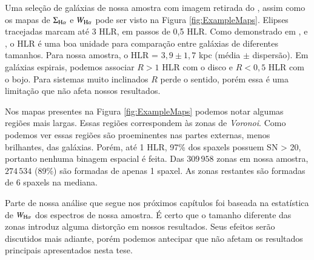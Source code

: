 Uma seleção de galáxias de nossa amostra com imagem retirada do \SDSS, assim como os mapas de $\Sigma_{\Ha}$ e $W_{\Ha}$ pode ser visto na Figura \ref{fig:ExampleMaps}. Elipses tracejadas marcam até 3 HLR, em passos de 0,5 HLR. Como demonstrado em \citet{Perez.etal.2013}, \citet{Sanchez.etal.2014} e \citet{GonzalezDelgado.etal.2016a}, o HLR é uma boa unidade para comparação entre galáxias de diferentes tamanhos. Para nossa amostra, o HLR = $3,9 \pm 1,7$ kpc (média $\pm$ dispersão). Em galáxias espirais, podemos associar $R > 1$ HLR com o disco e $R < 0,5$ HLR com o bojo. Para sistemas muito inclinados $R$ perde o sentido, porém essa é uma limitação que não afeta nossos resultados.

Nos mapas presentes na Figura \ref{fig:ExampleMaps} podemos notar algumas regiões mais largas. Essas regiões correspondem às zonas de {\em Voronoi}. Como podemos ver essas regiões são proeminentes nas partes externas, menos brilhantes, das galáxias. Porém, até 1 HLR, 97\% dos spaxels possuem SN > 20, portanto nenhuma binagem espacial é feita. Das $309\,958$ zonas em nossa amostra, $274\,534$ (89\%) são formadas de apenas 1 spaxel. As zonas restantes são formadas de 6 spaxels na mediana.

Parte de nossa análise que segue nos próximos capítulos foi baseada na estatística de $W_{\Ha}$ dos espectros de nossa amostra. É certo que o tamanho diferente das zonas introduz alguma distorção em nossos resultados. Seus efeitos serão discutidos mais adiante, porém podemos antecipar que não afetam os resultados principais apresentados nesta tese.

